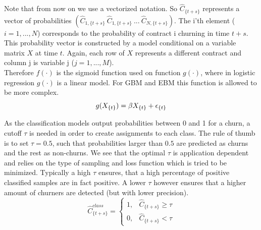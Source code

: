 \documentclass[12pt,titlepage]{article}
\begin{document}
\noindent
Note that from now on we use a vectorized notation. So $\hat{C}_{\{t+s\}}$ represents a vector of probabilities $(\hat{C}_{1,\{t+s\}}\:\hat{C}_{1,\{t+s\}}\:...\:\hat{C}_{N,\{t+s\}})$. The i'th element ($i = 1,...,N$) corresponds to the probability of contract i churning in time $t+s$. This probability vector is constructed by a model conditional on a variable matrix $X$ at time $t$. Again, each row of $X$ represents a different contract and column j is variable j ($j = 1,...,M$). \\
Therefore $f(\cdot)$ is the sigmoid function used on function $g(\cdot)$, where in logistic regression $g(\cdot)$ is a linear model. For GBM and EBM this function is allowed to be more complex.
\vspace{5mm}
\noindent
\begin{equation} \label{lin_model}
    g(X_{\{t\}}) = \beta X_{\{t\}} + \epsilon_{\{t\}} \\
\end{equation}
\vspace{1mm}

\noindent
As the classification models output probabilities between 0 and 1 for a churn, a cutoff $\tau$ is needed in order to create assignments to each class. The rule of thumb is to set $\tau = 0.5$, such that probabilities larger than $0.5$ are predicted as churns and the rest as non-churns. We see that the optimal $\tau$ is application dependent and relies on the type of sampling and loss function which is tried to be minimized. Typically a high $\tau$ ensures, that a high percentage of positive classified samples are in fact positive. A lower $\tau$ however ensures that a higher amount of churners are detected (but with lower precision).
\vspace{5mm}
\noindent
\begin{equation} \label{tau}
    \hat{C}_{\{t+s\}}^{class} = \begin{cases}
        1,& \hat{C}_{\{t+s\}} \geq \tau \\
        0,& \hat{C}_{\{t+s\}} < \tau
    \end{cases}
\end{equation}
\vspace{1mm}
\end{document}
